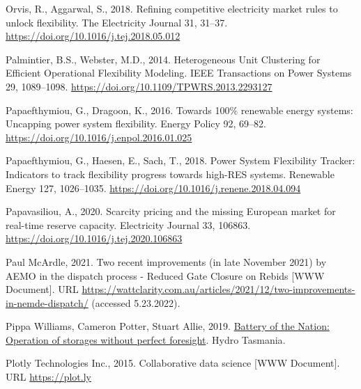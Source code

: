 \documentclass[12pt,a4paper,]{report}
\newlength{\cslhangindent}
\newenvironment{CSLReferences}[2] %
 {%
  \setlength{\parindent}{0pt}
  \ifodd #1 \everypar{\setlength{\hangindent}{\cslhangindent}}\ignorespaces\fi
  \ifnum #2 > 0
  \setlength{\parskip}{#2\baselineskip}
  \fi
 }%
 {}
\begin{document}
\begin{CSLReferences}{1}{0}
\leavevmode{}%
Orvis, R., Aggarwal, S., 2018. Refining competitive electricity market
rules to unlock flexibility. The Electricity Journal 31, 31--37.
\url{https://doi.org/10.1016/j.tej.2018.05.012}

\leavevmode{}%
Palmintier, B.S., Webster, M.D., 2014. Heterogeneous {Unit Clustering}
for {Efficient Operational Flexibility Modeling}. IEEE Transactions on
Power Systems 29, 1089--1098.
\url{https://doi.org/10.1109/TPWRS.2013.2293127}

\leavevmode{}%
Papaefthymiou, G., Dragoon, K., 2016. Towards 100\% renewable energy
systems: {Uncapping} power system flexibility. Energy Policy 92, 69--82.
\url{https://doi.org/10.1016/j.enpol.2016.01.025}

\leavevmode{}%
Papaefthymiou, G., Haesen, E., Sach, T., 2018. Power {System Flexibility
Tracker}: {Indicators} to track flexibility progress towards high-{RES}
systems. Renewable Energy 127, 1026--1035.
\url{https://doi.org/10.1016/j.renene.2018.04.094}

\leavevmode{}%
Papavasiliou, A., 2020. Scarcity pricing and the missing {European}
market for real-time reserve capacity. Electricity Journal 33, 106863.
\url{https://doi.org/10.1016/j.tej.2020.106863}

\leavevmode{}%
Paul McArdle, 2021. Two recent improvements (in late {November} 2021) by
{AEMO} in the dispatch process - {Reduced Gate Closure} on {Rebids}
{[}WWW Document{]}. URL
\url{https://wattclarity.com.au/articles/2021/12/two-improvements-in-nemde-dispatch/}
(accessed 5.23.2022).

\leavevmode{}%
Pippa Williams, Cameron Potter, Stuart Allie, 2019.
\href{https://www.hydro.com.au/docs/default-source/clean-energy/battery-of-the-nation/storage-with-imperfect-foresight.pdf?sfvrsn=72e59528_4}{Battery
of the {Nation}: {Operation} of storages without perfect foresight}.
{Hydro Tasmania}.

\leavevmode{}%
Plotly Technologies Inc., 2015. Collaborative data science {[}WWW
Document{]}. URL \url{https://plot.ly}


\end{CSLReferences}
\end{document}

